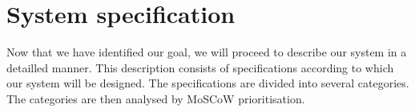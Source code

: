\documentclass[a4paper, openany, oneside]{memoir}
\begin{document}




\section{System specification}
\label{sec:theory-specs}
Now that we have identified our goal, we will proceed to describe our system in a detailled manner. This description consists of specifications according to which our system will be designed. The specifications are divided into several categories. The categories are then analysed by MoSCoW prioritisation.
\end{document}
